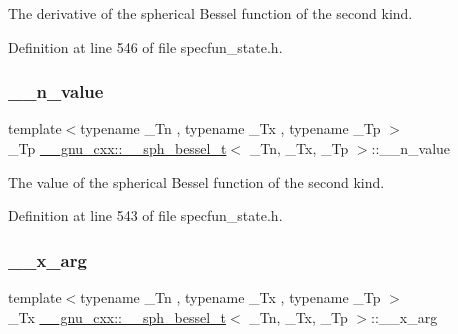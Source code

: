 The derivative of the spherical Bessel function of the second kind. 



Definition at line 546 of file specfun\+\_\+state.\+h.

\mbox{\label{struct____gnu__cxx_1_1____sph__bessel__t_ad846c3cb00bfabcbddc3e2f6512e3d7f}} 
\subsubsection{\texorpdfstring{\+\_\+\+\_\+n\+\_\+value}{\_\_n\_value}}
{\footnotesize\ttfamily template$<$typename \+\_\+\+Tn , typename \+\_\+\+Tx , typename \+\_\+\+Tp $>$ \\
\+\_\+\+Tp \hyperlink{struct____gnu__cxx_1_1____sph__bessel__t}{\+\_\+\+\_\+gnu\+\_\+cxx\+::\+\_\+\+\_\+sph\+\_\+bessel\+\_\+t}$<$ \+\_\+\+Tn, \+\_\+\+Tx, \+\_\+\+Tp $>$\+::\+\_\+\+\_\+n\+\_\+value}



The value of the spherical Bessel function of the second kind. 



Definition at line 543 of file specfun\+\_\+state.\+h.

\mbox{\label{struct____gnu__cxx_1_1____sph__bessel__t_afa9cf4b1888081bd21716c58ed19719b}} 
\subsubsection{\texorpdfstring{\+\_\+\+\_\+x\+\_\+arg}{\_\_x\_arg}}
{\footnotesize\ttfamily template$<$typename \+\_\+\+Tn , typename \+\_\+\+Tx , typename \+\_\+\+Tp $>$ \\
\+\_\+\+Tx \hyperlink{struct____gnu__cxx_1_1____sph__bessel__t}{\+\_\+\+\_\+gnu\+\_\+cxx\+::\+\_\+\+\_\+sph\+\_\+bessel\+\_\+t}$<$ \+\_\+\+Tn, \+\_\+\+Tx, \+\_\+\+Tp $>$\+::\+\_\+\+\_\+x\+\_\+arg}



